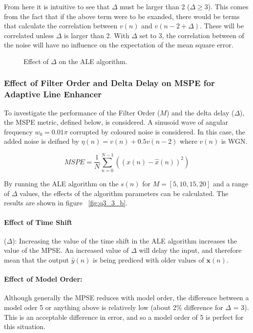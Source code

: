 \documentclass[main.tex]{subfiles}
\begin{document}
From here it is intuitive to see that $\Delta$ must be larger than 2 ($\Delta \ge 3$). This comes from the fact that if the above term were to be exanded, there would be terms that calculate the correlation between $v(n)$ and $v(n-2+\Delta)$. These will be correlated unless $\Delta$ is larger than 2. With $\Delta$ set to 3, the correlation between of the noise will have no influence on the expectation of the mean square error.


\begin{figure}[H]
	\centering 
	\resizebox{0.9\textwidth}{!}{}
	\caption{Effect of $\Delta$ on the ALE algorithm.}
	\label{fig:q3_3_a}
\end{figure}

\subsubsection{Effect of Filter Order and Delta Delay on MSPE for Adaptive Line Enhancer}

To investigate the performance of the Filter Order ($M$) and the delta delay ($\Delta$), the MSPE metric, defined below, is considered. A sinusoid wave of angular frequency $w_0 = 0.01\pi$ corrupted by coloured noise is considered. In this case, the added noise is deifned by $\eta(n) = v(n) + 0.5v(n-2)$ where $v(n)$ is WGN. 

\begin{equation}
	MSPE = \frac{1}{N}\sum_{n=0}^{N-1}((x(n)-\hat{x}(n))^2)
\end{equation}

By running the ALE algorithm on the $s(n)$ for $M=[5,10,15,20]$ and a range of $\Delta$ values, the effects of the algorithm parameters can be calculated. The results are shown in figure ~\ref{fig:q3_3_b}.

\paragraph*{Effect of Time Shift}($\Delta$): Increasing the value of the time shift in the ALE algorithm increases the value of the MPSE. An increased value of $\Delta$ will delay the input, and therefore mean that the output $\hat{y}(n)$ is being prediced with older values of $\textbf{x}(n)$. %

\paragraph*{Effect of Model Order:} Although generally the MPSE reduces with model order, the difference between a model oder 5 or anything above is relatively low (about 2\% difference for $\Delta$ = 3). This is an acceptable difference in error, and so a model order of 5 is perfect for this situation.
\end{document}
